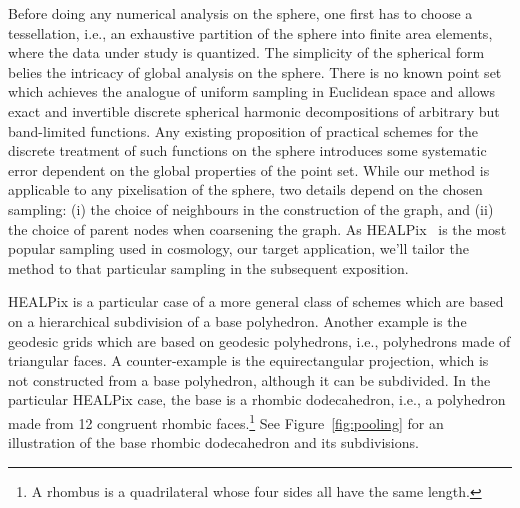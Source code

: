 \documentclass[final,twocolumn,3p,times,authoryear]{elsarticle}
\newcommand{\figref}[1]{Figure~\ref{fig:#1}}
\newcommand{\1}{\b{1}}              %
\newcommand{\0}{\b{0}}              %
\begin{document}

Before doing any numerical analysis on the sphere, one first has to choose a tessellation, i.e., an exhaustive partition of the sphere into finite area elements, where the data under study is quantized.
The simplicity of the spherical form belies the intricacy of global analysis on the sphere.
There is no known point set which achieves the analogue of uniform sampling in Euclidean space and allows exact and invertible discrete spherical harmonic decompositions of arbitrary but band-limited functions.
Any existing proposition of practical schemes for the discrete treatment of such functions on the sphere introduces some systematic error dependent on the global properties of the point set.
While our method is applicable to any pixelisation of the sphere, two details depend on the chosen sampling: (i) the choice of neighbours in the construction of the graph, and (ii) the choice of parent nodes when coarsening the graph.
As HEALPix~\citep{gorski2005healpix} is the most popular sampling used in cosmology, our target application, we'll tailor the method to that particular sampling in the subsequent exposition.

HEALPix is a particular case of a more general class of schemes which are based on a hierarchical subdivision of a base polyhedron.
Another example is the geodesic grids which are based on geodesic polyhedrons, i.e., polyhedrons made of triangular faces. A counter-example is the equirectangular projection, which is not constructed from a base polyhedron, although it can be subdivided.
In the particular HEALPix case, the base is a rhombic dodecahedron, i.e., a polyhedron made from 12 congruent rhombic faces.\footnote{A rhombus is a quadrilateral whose four sides all have the same length.}
See \figref{pooling} for an illustration of the base rhombic dodecahedron and its subdivisions.
\end{document}
